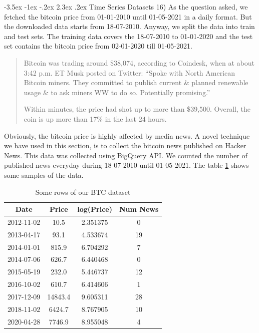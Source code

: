 \documentclass[11pt]{article}
\makeatletter
\renewcommand\section{\@startsection {section}{1}{\z@}%
                                       {-3.5ex \@plus -1ex \@minus -.2ex}%
                                       {2.3ex \@plus.2ex}%
                                       {\normalfont\fontfamily{phv}\fontsize{16}{19}\bfseries}}
\makeatother
\begin{document}
\section{Time Series Datasets}
16) As the question asked, we fetched the bitcoin price from 01-01-2010 until 01-05-2021 in a daily format. But the downloaded data starts from 18-07-2010. Anyway, we split the data into train and test sets. The training data covers the 18-07-2010 to 01-01-2020 and the test set contains the bitcoin price from 02-01-2020 till 01-05-2021. 


\begin{quote}
Bitcoin was trading around \$38,074, according to Coindesk, when at about 3:42 p.m. ET Musk posted on Twitter: “Spoke with North American Bitcoin miners. They committed to publish current \& planned renewable usage \& to ask miners WW to do so. Potentially promising.”

Within minutes, the price had shot up to more than \$39,500. Overall, the coin is up more than 17\% in the last 24 hours.
\end{quote}
Obviously, the bitcoin price is highly affected by media news.  A novel technique we have used in this section, is to collect the bitcoin news published on Hacker News. This data was collected using BigQuery API. We counted the number of published news everyday during 18-07-2010 until 01-05-2021. The table \ref{tbl:4} shows some samples of the data.

\begin{table}[]
\centering
\begin{tabular}{@{}cccc@{}}
\toprule
\textbf{Date} & \textbf{Price} & \textbf{log(Price)} & \textbf{Num News} \\ \midrule
2012-11-02 & 10.5 & 2.351375 & 0 \\
2013-04-17 & 93.1 & 4.533674 & 19 \\
2014-01-01 & 815.9 & 6.704292 & 7 \\
2014-07-06 & 626.7 & 6.440468 & 0 \\
2015-05-19 & 232.0 & 5.446737 & 12 \\
2016-10-02 & 610.7 & 6.414606 & 1 \\
2017-12-09 & 14843.4 & 9.605311 & 28 \\
2018-11-02 & 6424.7 & 8.767905 & 10 \\
2020-04-28 & 7746.9 & 8.955048 & 4 \\ \bottomrule
\end{tabular}
\caption{Some rows of our BTC dataset}
\label{tbl:4}
\end{table}
\end{document}
